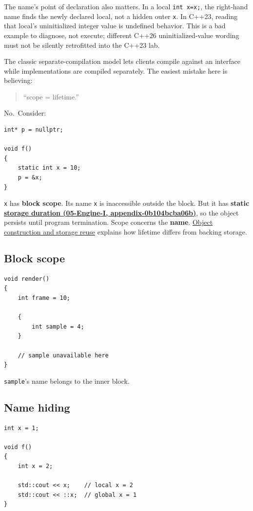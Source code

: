 The name's point of declaration also matters. In a local \texttt{int\ x=x;}, the right-hand name finds the newly declared local, not a hidden outer \texttt{x}. In C++23, reading that local's uninitialized integer value is undefined behavior. This is a bad example to diagnose, not execute; different C++26 uninitialized-value wording must not be silently retrofitted into the C++23 lab.

The classic separate-compilation model lets clients compile against an interface while implementations are compiled separately. The easiest mistake here is believing:

\begin{quote}
``scope = lifetime.''
\end{quote}

No.~Consider:

\begin{verbatim}
int* p = nullptr;

void f()
{
    static int x = 10;
    p = &x;
}
\end{verbatim}

\texttt{x} has \textbf{block scope}. Its name \texttt{x} is inaccessible outside the block. But it has \textbf{static \href{../05-Engine-I/main.pdf\#nameddest=appendix-0b104bcba06b}{storage duration (05-Engine-I, appendix-0b104bcba06b)}}, so the object persists until program termination. Scope concerns the \textbf{name}. \hyperref[appendix-a82f9c438857]{Object construction and storage reuse} explains how lifetime differs from backing storage.

\subsection{Block scope}\label{01-foundations-i-ch002-block-scope}

\begin{verbatim}
void render()
{
    int frame = 10;

    {
        int sample = 4;
    }

    // sample unavailable here
}
\end{verbatim}

\texttt{sample}'s name belongs to the inner block.

\subsection{Name hiding}\label{01-foundations-i-ch002-name-hiding}

\begin{verbatim}
int x = 1;

void f()
{
    int x = 2;

    std::cout << x;    // local x = 2
    std::cout << ::x;  // global x = 1
}
\end{verbatim}


